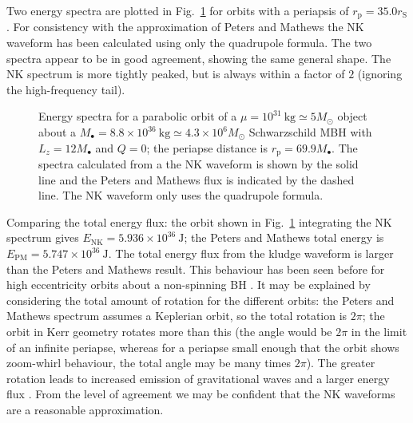 \documentclass[useAMS,usedcolumn,usegraphicx,usenatbib]{mn2e}
\newcommand{\figref}[1]{Fig.~\ref{fig:#1}}
\newcommand{\units}[1]{\ensuremath{~\mathrm{#1}}}
\newcommand{\sub}[1]{\ensuremath{_\mathrm{#1}}}
\begin{document}
Two energy spectra are plotted in \figref{Energy} for orbits with a periapsis of $r\sub{p} = 35.0 r\sub{S}$. For consistency with the approximation of Peters and Mathews the NK waveform has been calculated using only the quadrupole formula. The two spectra appear to be in good agreement, showing the same general shape. The NK spectrum is more tightly peaked, but is always within a factor of $2$ (ignoring the high-frequency tail).
\begin{figure}
  \begin{center}
    \caption{Energy spectra for a parabolic orbit of a $\mu = 10^{31}\units{kg} \simeq 5 M_\odot$ object about a $M_\bullet = 8.8 \times 10^{36}\units{kg} \simeq 4.3 \times 10^6 M_\odot$ Schwarzschild MBH with $L_z = 12 M_\bullet$ and $Q = 0$; the periapse distance is $r\sub{p} = 69.9 M_\bullet$. The spectra calculated from a the NK waveform is shown by the solid line and the Peters and Mathews flux is indicated by the dashed line. The NK waveform only uses the quadrupole formula.}
    \label{fig:Energy}
  \end{center}
\end{figure}

Comparing the total energy flux: the orbit shown in \figref{Energy} integrating the NK spectrum gives $E\sub{NK} = 5.936 \times 10^{36}\units{J}$; the Peters and Mathews total energy is $E\sub{PM} = 5.747 \times 10^{36}\units{J}$. The total energy flux from the kludge waveform is larger than the Peters and Mathews result. This behaviour has been seen before for high eccentricity orbits about a non-spinning BH \citep{Gair2005}. It may be explained by considering the total amount of rotation for the different orbits: the Peters and Mathews spectrum assumes a Keplerian orbit, so the total rotation is $2\pi$; the orbit in Kerr geometry rotates more than this (the angle would be $2\pi$ in the limit of an infinite periapse, whereas for a periapse small enough that the orbit shows zoom-whirl behaviour, the total angle may be many times $2\pi$). The greater rotation leads to increased emission of gravitational waves and a larger energy flux \citep{Berry2010}. From the level of agreement we may be confident that the NK waveforms are a reasonable approximation.
\end{document}
